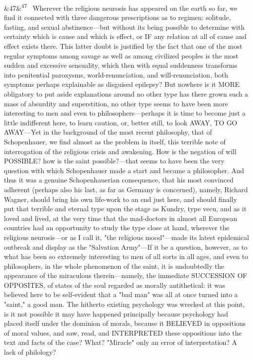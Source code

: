 \documentclass[12pt]{article}
\newcommand{\para}[1][]{\par\noindent\ifx&#1&\else\textsuperscript{\footnotesize #1}~\fi}
\begin{document}
\para[47] Wherever the religious neurosis has appeared on the earth so far, we find it connected with three dangerous prescriptions as to regimen: solitude, fasting, and sexual abstinence---but without its being possible to determine with certainty which is cause and which is effect, or IF any relation at all of cause and effect exists there. This latter doubt is justified by the fact that one of the most regular symptoms among savage as well as among civilized peoples is the most sudden and excessive sensuality, which then with equal suddenness transforms into penitential paroxysms, world-renunciation, and will-renunciation, both symptoms perhaps explainable as disguised epilepsy? But nowhere is it MORE obligatory to put aside explanations around no other type has there grown such a mass of absurdity and superstition, no other type seems to have been more interesting to men and even to philosophers---perhaps it is time to become just a little indifferent here, to learn caution, or, better still, to look AWAY, TO GO AWAY---Yet in the background of the most recent philosophy, that of Schopenhauer, we find almost as the problem in itself, this terrible note of interrogation of the religious crisis and awakening. How is the negation of will POSSIBLE? how is the saint possible?---that seems to have been the very question with which Schopenhauer made a start and became a philosopher. And thus it was a genuine Schopenhauerian consequence, that his most convinced adherent (perhaps also his last, as far as Germany is concerned), namely, Richard Wagner, should bring his own life-work to an end just here, and should finally put that terrible and eternal type upon the stage as Kundry, type vecu, and as it loved and lived, at the very time that the mad-doctors in almost all European countries had an opportunity to study the type close at hand, wherever the religious neurosis---or as I call it, "the religious mood"---made its latest epidemical outbreak and display as the "Salvation Army"---If it be a question, however, as to what has been so extremely interesting to men of all sorts in all ages, and even to philosophers, in the whole phenomenon of the saint, it is undoubtedly the appearance of the miraculous therein---namely, the immediate SUCCESSION OF OPPOSITES, of states of the soul regarded as morally antithetical: it was believed here to be self-evident that a "bad man" was all at once turned into a "saint," a good man. The hitherto existing psychology was wrecked at this point, is it not possible it may have happened principally because psychology had placed itself under the dominion of morals, because it BELIEVED in oppositions of moral values, and saw, read, and INTERPRETED these oppositions into the text and facts of the case? What? "Miracle" only an error of interpretation? A lack of philology?
\end{document}
